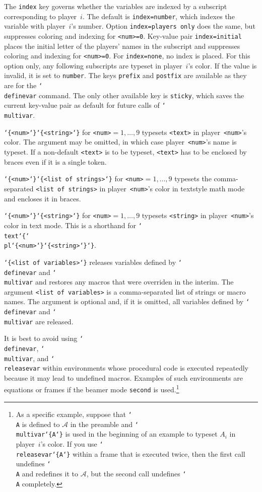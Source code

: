 \documentclass{article}
\newenvironment{desc}{\itemize[leftmargin=50pt]}{\enditemize}
\def\macroarg#1#2{\item[\cmd{#1}] \hskip-2.5pt\texttt{#2}}
\renewcommand{\textbackslash}{\char`\\}
\def\cmd#1{\texttt{\color{cmd}\textbackslash#1}}
\def\leftbrace{\char`\{}
\def\rightbrace{\char`\}}
\def\arg#1{{\color{cmd}\leftbrace}{\color{black}#1}{\color{cmd}\rightbrace}}
\begin{document}
\begin{desc}
The \texttt{index} key governs whether the variables are indexed by a subscript corresponding to player~$i$. The default is \texttt{index=number}, which indexes the variable with player~$i$'s number. Option \texttt{index=players only} does the same, but suppresses coloring and indexing for \texttt{<num>=0}. Key-value pair \texttt{index=initial} places the initial letter of the players' names in the subscript and suppresses coloring and indexing for \texttt{<num>=0}. For \texttt{index=none}, no index is placed. For this option only, any following subscripts are typeset in player~$i$'s color. If the value is invalid, it is set to \texttt{number}. The keys \texttt{prefix} and \texttt{postfix} are available as they are for the \cmd{definevar} command. The only other available key is \texttt{sticky}, which saves the current key-value pair as default for future calls of \cmd{multivar}. 

\macroarg{pl}{\arg{<num>}\arg{<string>}} for \texttt{<num>}$=1, \ldots, 9$ typesets \texttt{<text>} in player~\texttt{<num>}'s color. The argument may be omitted, in which case player~\texttt{<num>}'s name is typeset. If a non-default \texttt{<text>} is to be typeset, \texttt{<text>} has to be enclosed by braces even if it is a single token.

\macroarg{plset}{\arg{<num>}\arg{<list of strings>}} for \texttt{<num>}$=1, \ldots, 9$ typesets the comma-separated \texttt{<list of strings>} in player~\texttt{<num>}'s color in textstyle math mode and encloses it in braces.

\macroarg{pltext}{\arg{<num>}\arg{<string>}} for \texttt{<num>}$=1, \ldots, 9$ typesets \texttt{<string>} in player~\texttt{<num>}'s color in text mode. This is a shorthand for \cmd{text\arg{\cmd{pl\arg{<num>}\arg{<string>}}}}.

\macroarg{releasevar}{\arg{<list of variables>}} releases variables defined by \cmd{definevar} and \cmd{multivar} and restores any macros that were overriden in the interim. The argument \texttt{<list of variables>} is a comma-separated list of strings or macro names. The argument is optional and, if it is omitted, all variables defined by \cmd{definevar} and \cmd{multivar} are released.

{\color{player4}It is best to avoid using \cmd{definevar}, \cmd{multivar}, and \cmd{releasevar} within environments whose procedural code is executed repeatedly because it may lead to undefined macros. Examples of such environments are equations or frames if the beamer mode \texttt{second} is used.\footnote{As a specific example, suppose that \cmd{A} is defined to $\mathcal{A}$ in the preamble and \cmd{multivar\arg{A}} is used in the beginning of an example to typeset $A_i$ in player~$i$'s color. If you use \cmd{releasevar\arg{A}} within a frame that is executed twice, then the first call undefines \cmd{A} and redefines it to $\mathcal{A}$, but the second call undefines \cmd{A} completely.}}


\end{desc}
\end{document}

